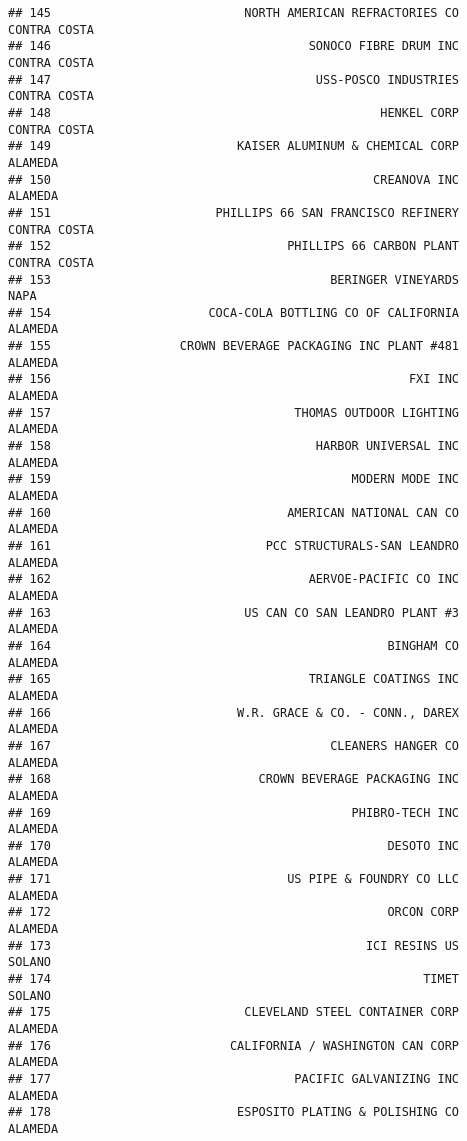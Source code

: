 \documentclass[
]{book}
\begin{document}
\begin{verbatim}
## 145                           NORTH AMERICAN REFRACTORIES CO  CONTRA COSTA
## 146                                    SONOCO FIBRE DRUM INC  CONTRA COSTA
## 147                                     USS-POSCO INDUSTRIES  CONTRA COSTA
## 148                                              HENKEL CORP  CONTRA COSTA
## 149                          KAISER ALUMINUM & CHEMICAL CORP       ALAMEDA
## 150                                             CREANOVA INC       ALAMEDA
## 151                       PHILLIPS 66 SAN FRANCISCO REFINERY  CONTRA COSTA
## 152                                 PHILLIPS 66 CARBON PLANT  CONTRA COSTA
## 153                                       BERINGER VINEYARDS          NAPA
## 154                      COCA-COLA BOTTLING CO OF CALIFORNIA       ALAMEDA
## 155                  CROWN BEVERAGE PACKAGING INC PLANT #481       ALAMEDA
## 156                                                  FXI INC       ALAMEDA
## 157                                  THOMAS OUTDOOR LIGHTING       ALAMEDA
## 158                                     HARBOR UNIVERSAL INC       ALAMEDA
## 159                                          MODERN MODE INC       ALAMEDA
## 160                                 AMERICAN NATIONAL CAN CO       ALAMEDA
## 161                              PCC STRUCTURALS-SAN LEANDRO       ALAMEDA
## 162                                    AERVOE-PACIFIC CO INC       ALAMEDA
## 163                           US CAN CO SAN LEANDRO PLANT #3       ALAMEDA
## 164                                               BINGHAM CO       ALAMEDA
## 165                                    TRIANGLE COATINGS INC       ALAMEDA
## 166                          W.R. GRACE & CO. - CONN., DAREX       ALAMEDA
## 167                                       CLEANERS HANGER CO       ALAMEDA
## 168                             CROWN BEVERAGE PACKAGING INC       ALAMEDA
## 169                                          PHIBRO-TECH INC       ALAMEDA
## 170                                               DESOTO INC       ALAMEDA
## 171                                 US PIPE & FOUNDRY CO LLC       ALAMEDA
## 172                                               ORCON CORP       ALAMEDA
## 173                                            ICI RESINS US        SOLANO
## 174                                                    TIMET        SOLANO
## 175                           CLEVELAND STEEL CONTAINER CORP       ALAMEDA
## 176                         CALIFORNIA / WASHINGTON CAN CORP       ALAMEDA
## 177                                  PACIFIC GALVANIZING INC       ALAMEDA
## 178                          ESPOSITO PLATING & POLISHING CO       ALAMEDA

\end{verbatim}
\end{document}
